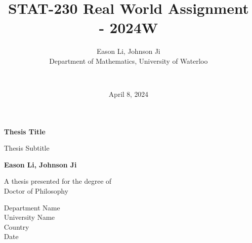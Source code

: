 \documentclass{article}
\title{STAT-230 Real World Assignment - 2024W}
\author{
    Eason Li, Johnson Ji \\
    Department of Mathematics, University of Waterloo \and \\
}
\date{April 8, 2024} %
\begin{document}
\begin{titlepage}
    \begin{center}
        \vspace*{1cm}
            
        \Huge
        \textbf{Thesis Title}
            
        \vspace{0.5cm}
        \LARGE
        Thesis Subtitle
            
        \vspace{1.5cm}
            
        \textbf{Eason Li, Johnson Ji}
            
        \vfill
            
        A thesis presented for the degree of\\
        Doctor of Philosophy
            
        \vspace{0.8cm}
            
        \Large
        Department Name\\
        University Name\\
        Country\\
        Date
            
    \end{center}
\end{titlepage}
\end{document}
